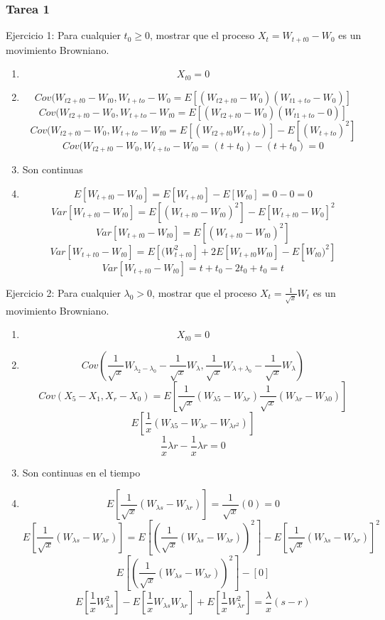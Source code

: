 \documentclass[11pt,fleqn]{book} %
\numberwithin{equation}{section} %
\numberwithin{figure}{section} %
\numberwithin{table}{section} %
\begin{document}
\subsubsection{Tarea 1}
Ejercicio 1: Para cualquier $t_{0} \geq 0$, mostrar que el proceso $X_{t} = W_{t +t0} - W_{0}$ es un movimiento Browniano.
\begin{enumerate}
    \item $$ X_{t0} = 0 $$
    \item $$ Cov(W_{t2 +t0} - W_{t0},W_{t +to} - W_{0} = E[(W_{t2 +t0} - W_{0})(W_{t1 +to} - W_{0})] $$
    $$ Cov(W_{t2 +t0} - W_{0},W_{t +to} - W_{t0} = E[(W_{t2 +t0} - W_{0})(W_{t1 +to} - 0)] $$
    $$ Cov(W_{t2 +t0} - W_{0},W_{t +to} - W_{t0} = E[(W_{t2 +t0}W_{t +to})] - E[(W_{t +to})^2] $$
    $$ Cov(W_{t2 +t0}- W_{0},W_{t +to} - W_{t0} = (t+t_{0})-(t+t_{0}) = 0 $$
    \item Son continuas
    \item $$E[W_{t +t0} - W_{t0}] = E[W_{t +t0}] - E[W_{t0}] = 0-0 = 0$$
    $$ Var[W_{t +t0} - W_{t0}] = E[(W_{t +t0} - W_{t0})^2] - E[W_{t +t0} - W_{0}]^2 $$
    $$ Var[W_{t +t0} - W_{t0}] = E[(W_{t +t0} - W_{t0})^2] $$
    $$ Var[W_{t +t0} - W_{t0}] = E[(W_{t +t0}^{2}] + 2E[W_{t+t0}W_{t0}] - E[W_{t0})^2] $$
    $$ Var[W_{t +t0} - W_{t0}] = t + t_{0} -2t_{0} + t_{0} = t $$
\end{enumerate}
Ejercicio 2: Para cualquier $\lambda_{0} > 0$, mostrar que el proceso $X_{t} = \frac{1}{\sqrt{x}} W_{t}$ es un movimiento Browniano.
\begin{enumerate}
    \item $$ X_{t0} = 0 $$
    \item $$ Cov(\frac{1}{\sqrt{x}} W_{\lambda_{2} - \lambda_{0}} - \frac{1}{\sqrt{x}} W_{\lambda}, \frac{1}{\sqrt{x}} W_{\lambda + \lambda_{0}} - \frac{1}{\sqrt{x}} W_{\lambda} ) $$
    $$ Cov(X_{5} - X_{1} , X_{r} - X_{0}) = E[\frac{1}{\sqrt{x}}(W_{\lambda 5} - W_{\lambda r})    \frac{1}{\sqrt{x}}(W_{\lambda r} - W_{\lambda 0})  ]     $$
    $$ E[\frac{1}{x} (  W_{\lambda 5} - W_{\lambda r} - W_{\lambda r^{2}} )] $$
    $$ \frac{1}{x} \lambda r - \frac{1}{x} \lambda r  = 0   $$
    \item Son continuas en el tiempo
    \item $$E[\frac{1}{\sqrt{x}} (W_{\lambda s} - W_{\lambda r})] = \frac{1}{\sqrt{x}} (0) = 0$$
    $$E[\frac{1}{\sqrt{x}} (W_{\lambda s} - W_{\lambda r})] = E[(\frac{1}{\sqrt{x}}(W_{\lambda s} - W_{\lambda r}))^{2}] - E[\frac{1}{\sqrt{x}} (W_{\lambda s} - W_{\lambda r})]^{2}$$
    $$ E[(\frac{1}{\sqrt{x}}(W_{\lambda s} - W_{\lambda r}))^{2}]-[0]$$
    $$ E[\frac{1}{x} W_{\lambda s}^{2}] - E[\frac{1}{x} W_{\lambda s} W_{\lambda r} ] + E[\frac{1}{x} W_{\lambda r}^{2} ] = \frac{\lambda}{x} (s-r)  $$
\end{enumerate}
\end{document}
